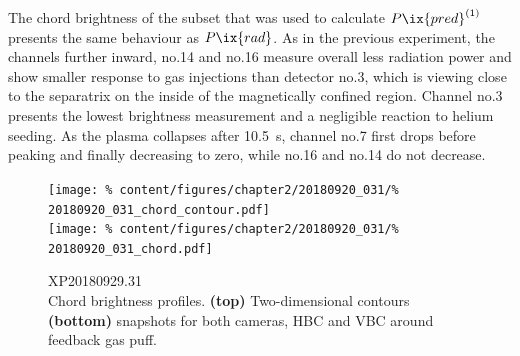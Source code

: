             The chord brightness of the subset that was used to calculate $P\ix{pred}^{\left(1\right)}$ presents the same behaviour as $P\ix{rad}$. As in the previous experiment, the channels further inward, no.14 and no.16 measure overall less radiation power and show smaller response to gas injections than detector no.3, which is viewing close to the separatrix on the inside of the magnetically confined region. Channel no.3 presents the lowest brightness measurement and a negligible reaction to helium seeding. As the plasma collapses after \SI{10.5}{\second}, channel no.7 first drops before peaking and finally decreasing to zero, while no.16 and no.14 do not decrease.\\%
%
            \begin{figure}[t]%
                \centering%
                \texttt{[image: \%
                    content/figures/chapter2/20180920\_031/\%
                    20180920\_031\_chord\_contour.pdf]}\\%
                \texttt{[image: \%
                    content/figures/chapter2/20180920\_031/\%
                    20180920\_031\_chord.pdf]}\\%
                \caption{%
                    XP20180929.31\\%
                    Chord brightness profiles. \textbf{(top)} Two-dimensional contours \textbf{(bottom)} snapshots for both cameras, HBC and VBC around feedback gas puff.}\label{fig:20180920.31_CP}%
            \end{figure}%
%
